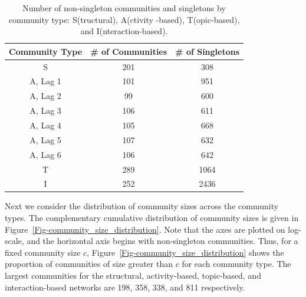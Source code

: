 \begin{table}[ht]
	\caption{Number of non-singleton communities and singletons by community type: S(tructural), A(ctivity -based), T(opic-based), and I(nteraction-based).}
	\centering
	\begin{tabular}{| c | c | c |}
		\hline Community Type & \# of Communities & \# of Singletons \\ \hline
		S & 201 & 308 \\
		A, Lag 1 & 101 & 951 \\
		A, Lag 2 & 99 & 600 \\
		A, Lag 3 & 106 & 611 \\
		A, Lag 4 & 105 & 668 \\
		A, Lag 5 & 107 & 632 \\
		A, Lag 6 & 106 & 642 \\
		T & 289 & 1064 \\
		I & 252 & 2436 \\ \hline
	\end{tabular}
	\label{Table-comm_count}
\end{table}

Next we consider the distribution of community sizes across the community types. The complementary cumulative distribution of community sizes is given in Figure~\ref{Fig-community_size_distribution}. Note that the axes are plotted on log-scale, and the horizontal axis begins with non-singleton communities. Thus, for a fixed community size $c$, Figure~\ref{Fig-community_size_distribution} shows the proportion of communities of size greater than $c$ for each community type. The largest communities for the structural, activity-based, topic-based, and interaction-based networks are 198, 358, 338, and 811 respectively.

